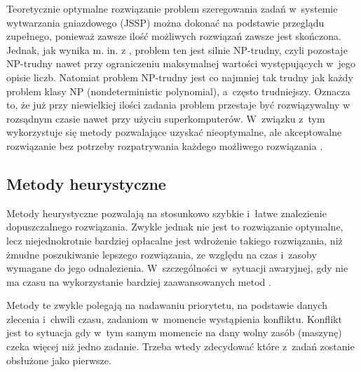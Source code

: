 \documentclass[twoside]{kInzynierka}
\begin{document}
Teoretycznie optymalne rozwiązanie problem szeregowania zadań w~systemie wytwarzania gniazdowego (JSSP) można dokonać na podstawie przeglądu zupełnego, ponieważ zawsze ilość możliwych rozwiązań zawsze jest skończona. Jednak, jak wynika m. in. z \cite{np1}\cite{np2}, problem ten jest silnie NP-trudny, czyli pozostaje NP-trudny nawet przy ograniczeniu maksymalnej wartości występujących w~jego opisie liczb. Natomiat problem NP-trudny jest co najmniej tak trudny jak każdy problem klasy NP (nondeterministic polynomial), a~często trudniejszy. Oznacza to, że już przy niewielkiej ilości zadania problem przestaje być rozwiązywalny w rozsądnym czasie nawet przy użyciu superkomputerów. W~związku z~tym wykorzystuje się metody pozwalające uzyskać nieoptymalne, ale akceptowalne rozwiązanie bez potrzeby rozpatrywania każdego możliwego rozwiązania \cite{np}.

\subsection     {Metody heurystyczne}
Metody heurystyczne pozwalają na stosunkowo szybkie i~łatwe znalezienie dopuszczalnego rozwiązania. Zwykle jednak nie jest to rozwiązanie optymalne, lecz niejednokrotnie bardziej opłacalne jest wdrożenie takiego rozwiązania, niż żmudne poszukiwanie lepszego rozwiązania, ze względu na czas i~zasoby wymagane do jego odnalezienia. W~szczególności w~sytuacji awaryjnej, gdy nie ma czasu na wykorzystanie bardziej zaawansowanych metod \cite{dynamic}. 

Metody te zwykle polegają na nadawaniu priorytetu, na podstawie danych zlecenia i~chwili czasu, zadaniom w~momencie wystąpienia konfliktu. Konflikt jest to sytuacja gdy w~tym samym momencie na dany wolny zasób (maszynę) czeka więcej niż jedno zadanie. Trzeba wtedy zdecydować które z~zadań zostanie obsłużone jako pierwsze. 
\end{document}
